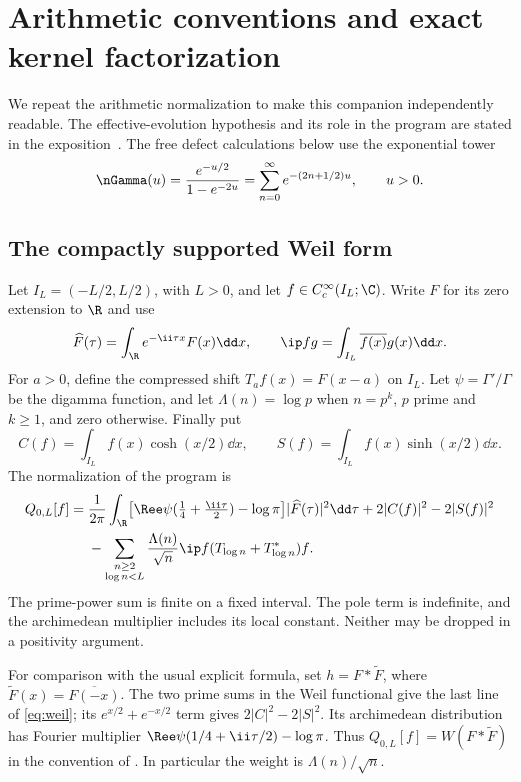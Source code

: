\section{Arithmetic conventions and exact kernel factorization}\label{sec:arithmetic}

We repeat the arithmetic normalization to make this companion
independently readable. The effective-evolution hypothesis and its
role in the program are stated in the exposition~\cite{Exposition}.
The free defect calculations below use the exponential tower
\begin{equation}\label{eq:intro-tower}
 \nGamma(u)=\frac{e^{-u/2}}{1-e^{-2u}}
 =\sum_{n=0}^\infty e^{-(2n+1/2)u},\qquad u>0.
\end{equation}

\subsection{The compactly supported Weil form}

Let $I_L=(-L/2,L/2)$, with $L>0$, and let
$f\in C_c^\infty(I_L;\C)$. Write $F$ for its zero extension to $\R$ and use
\begin{equation}
 \widehat F(\tau)=\int_\R e^{-\ii\tau x}F(x)\dd x,
 \qquad \ip f g=\int_{I_L}\overline{f(x)}g(x)\dd x.
\end{equation}
For $a>0$, define the compressed shift $T_af(x)=F(x-a)$ on $I_L$.
Let $\psi=\Gamma'/\Gamma$ be the digamma function, and let
$\Lambda(n)=\log p$ when $n=p^k$, $p$ prime and $k\geq1$, and zero otherwise.
Finally put
\begin{equation}
 C(f)=\int_{I_L}f(x)\cosh(x/2)\dd x,
 \qquad S(f)=\int_{I_L}f(x)\sinh(x/2)\dd x.
\end{equation}
The normalization of the program is
\begin{align}\label{eq:weil}
 Q_{0,L}[f]={}&\frac1{2\pi}\int_\R
 \bigl[\Ree\psi(\tfrac14+\tfrac{\ii\tau}2)-\log\pi\bigr]
 |\widehat F(\tau)|^2\dd\tau
 +2|C(f)|^2-2|S(f)|^2\notag\\
 &-\sum_{\substack{n\geq2\\\log n<L}}
 \frac{\Lambda(n)}{\sqrt n}\ip f{(T_{\log n}+T_{\log n}^*)f}.
\end{align}
The prime-power sum is finite on a fixed interval. The pole term is
indefinite, and the archimedean multiplier includes its local constant.
Neither may be dropped in a positivity argument.

For comparison with the usual explicit formula, set
$h=F*\widetilde F$, where $\widetilde F(x)=\overline{F(-x)}$.
The two prime sums in the Weil functional give the last line of
\eqref{eq:weil}; its $e^{x/2}+e^{-x/2}$ term gives
$2|C|^2-2|S|^2$. Its archimedean distribution has Fourier multiplier
$\Ree\psi(1/4+\ii\tau/2)-\log\pi$. Thus
$Q_{0,L}[f]=W(F*\widetilde F)$ in the convention of
\cite[p.~1]{Suzuki}. In particular the weight is $\Lambda(n)/\sqrt n$.

